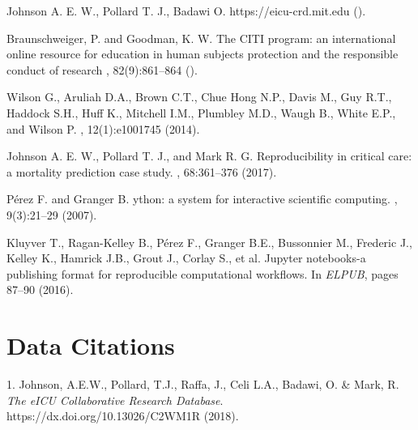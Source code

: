 \documentclass[english]{article}
\begin{document}
\begin{thebibliography}{1}
Johnson A. E. W., Pollard T. J., Badawi O.
\newblock {}
\newblock https://eicu-crd.mit.edu
().

Braunschweiger, P. and Goodman, K. W.
\newblock The CITI program: an international online resource for education in human subjects protection and the responsible conduct of research
, 82(9):861--864 ().

Wilson G., Aruliah D.A., Brown C.T., Chue Hong N.P., Davis M., Guy R.T., Haddock S.H., Huff K., Mitchell I.M., Plumbley M.D., Waugh B., White E.P., and Wilson P.
, 12(1):e1001745 (2014).

Johnson A. E. W., Pollard T. J., and Mark R. G.
\newblock Reproducibility in critical care: a mortality prediction case study.
, 68:361--376 (2017).

P\'erez F. and Granger B.
ython: a system for interactive scientific computing.
, 9(3):21--29 (2007).

Kluyver T., Ragan-Kelley B., P{\'e}rez F., Granger B.E., Bussonnier M., Frederic J., Kelley K., Hamrick J.B., Grout J., Corlay S., et al.
\newblock Jupyter notebooks-a publishing format for reproducible computational
  workflows.
\newblock In {\em ELPUB}, pages 87--90 (2016).

\end{thebibliography}

\section*{Data Citations}

1. Johnson, A.E.W., Pollard, T.J., Raffa, J., Celi L.A., Badawi, O. \& Mark, R. \emph{The eICU Collaborative Research Database}. https://dx.doi.org/10.13026/C2WM1R (2018).
\end{document}
